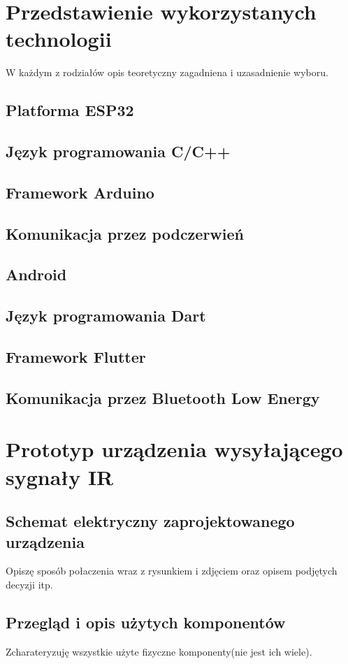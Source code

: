 \documentclass[12pt,twoside]{article}
\begin{document}
\section{Przedstawienie wykorzystanych technologii}
W każdym z rodziałów opis teoretyczny zagadniena i uzasadnienie wyboru.
\subsection{Platforma ESP32}
\subsection{Język programowania C/C++}
\subsection{Framework Arduino}
\subsection{Komunikacja przez podczerwień}
\subsection{Android}
\subsection{Język programowania Dart}
\subsection{Framework Flutter}
\subsection{Komunikacja przez Bluetooth Low Energy}

\clearpage	

\section{Prototyp urządzenia wysyłającego sygnały IR}
\subsection{Schemat elektryczny zaprojektowanego urządzenia}
Opiszę sposób połaczenia wraz z rysunkiem i zdjęciem oraz opisem podjętych decyzji itp.
\subsection{Przegląd i opis użytych komponentów}
Zcharateryzuję wszystkie użyte fizyczne komponenty(nie jest ich wiele).
\clearpage
\end{document}
